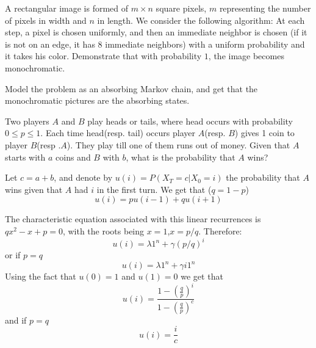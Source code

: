 \documentclass[a4paper,11pt]{exam}
\begin{document}
\begin{questions}
\begin{enumerate}
\end{enumerate}

\question

A rectangular image is formed of $ m \times n $ square pixels, $ m $ representing the number of pixels in
width and $ n $ in length.
We consider the following algorithm:
At each step, a pixel is chosen uniformly, and then an immediate neighbor is chosen
(if it is not on an edge, it has $ 8 $ immediate neighbors) with a uniform probability
and it takes his color.
Demonstrate that with probability $ 1 $, the image becomes monochromatic.

\begin{solution}
	Model the problem as an absorbing Markov chain, and get that the monochromatic pictures are the absorbing states. 
\end{solution}

\question
Two players $A$ and $B$ play heads or tails, where head occurs with probability $0\leq p\leq1$. Each time head(resp. tail) occurs player $A$(resp. $B$) gives 1 coin to player $B$(resp .$A$). They play till one of them runs out of money. Given that $A$ starts with $a$ coins and $B$ with $b$, what is the probability that $A$ wins?

\begin{solution}
	Let $c=a+b$, and denote by $u(i)=P(X_T=c|X_0=i)$ the probability that $A$ wins given that $A$ had $i$ in the first turn. We get that ($q=1-p$)
	\[
		u(i) = pu(i-1)+qu(i+1)
	\]
	
	The characteristic equation associated with this linear recurrences is $qx^2-x+p=0$, with the roots being $x=1$,$x=p/q$. Therefore:
	\[
		u(i) = \lambda1^n + \gamma(p/q)^i
	\]
	or if $p=q$
	\[
		u(i) = \lambda1^n + \gamma i1^n
	\]
	Using the fact that $ u(0)=1 $ and $ u(1)=0 $ we get that 
	\[
		u(i) = \frac{1-(\frac{q}{p})^i}{1-(\frac{q}{p})^c}
	\]
	and if $ p=q $
	\[
		u(i) = \frac{i}{c}
	\]
\end{solution}





\end{questions}
\end{document}
